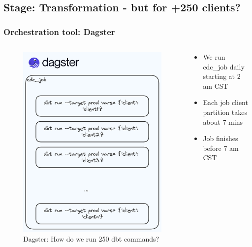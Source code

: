 \documentclass{beamer}
\begin{document}
\subsection{Stage: Transformation - but for +250 clients?}
\begin{frame}
    \frametitle{Orchestration tool: Dagster}
    \begin{columns}
        \begin{column}{0.5\textwidth}
            \begin{figure}
                \centering
                \includegraphics[width=1\textwidth]{pictures/dagster_job}
                \caption{Dagster: How do we run 250 dbt commands?}
            \end{figure}
        \end{column}
        \begin{column}{0.5\textwidth}
            \begin{itemize}
                \item We run cdc\_job daily starting at 2 am CST
                \item Each job client partition takes about 7 mins
                \item Job finishes before 7 am CST
            \end{itemize}
        \end{column}
    \end{columns}
\end{frame}
\end{document}
